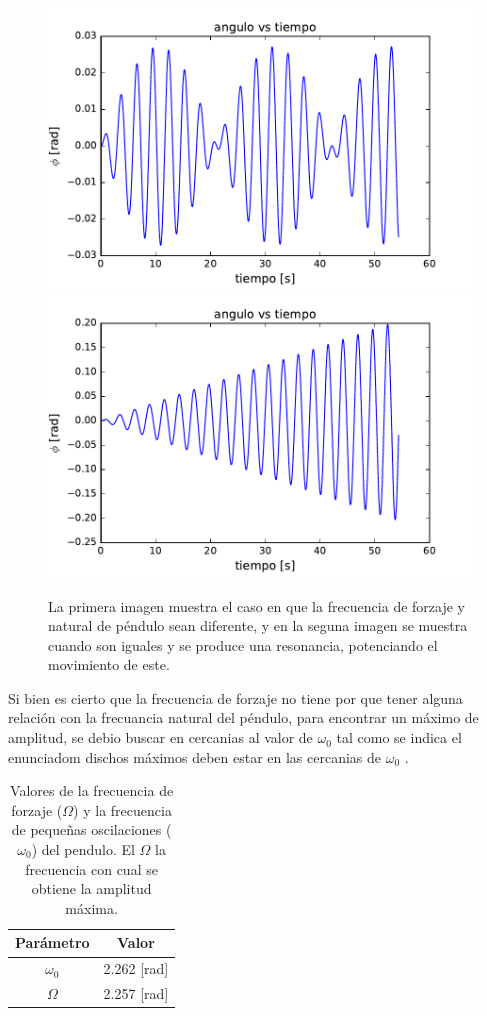 \documentclass[10pt]{article}
\begin{document}
\begin{figure}[H]
\includegraphics[scale=0.5]{forz_03.pdf}
\includegraphics[scale=0.5]{forz_00.pdf}
\caption{La primera imagen muestra el caso en que la frecuencia de forzaje y natural de péndulo sean diferente, y en la seguna imagen se muestra cuando son iguales y se produce una resonancia, potenciando el movimiento de este.}
\label{img_forz}
\end{figure}

 Si bien es cierto que la frecuencia de forzaje no tiene por que tener alguna relación con la frecuancia natural del péndulo, para encontrar un máximo de amplitud, se debio buscar en cercanias al valor de $\omega_0$ tal como se indica el enunciadom dischos máximos deben estar en las cercanias de $\omega_0$ .
\begin{table}[H]
\centering
\begin{tabular}{|c|c|}
\hline
Parámetro & Valor \\
\hline
$\omega_0$ & 2.262 [rad]\\
\hline
$\Omega$ & 2.257 [rad] \\
\hline
\end{tabular}
\caption{Valores de la frecuencia de forzaje ($\Omega$) y la frecuencia de pequeñas oscilaciones ($\omega_0$) del pendulo. El $\Omega$ la frecuencia con cual se obtiene la amplitud máxima.}
\label{tab_omega}
\end{table}
\end{document}
